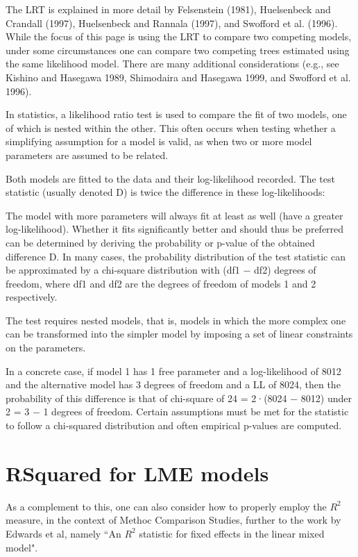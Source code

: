 \documentclass[12pt, a4paper]{report}
\theoremstyle{plain}
\theoremstyle{definition}
\theoremstyle{remark}
\begin{document}
The LRT is explained in more detail by Felsenstein (1981), Huelsenbeck and Crandall (1997), Huelsenbeck and Rannala (1997), and Swofford et al. (1996). While the focus of this page is using the LRT to compare two competing models, under some circumstances one can compare two competing trees estimated using the same likelihood model. There are many additional considerations (e.g., see Kishino and Hasegawa 1989, Shimodaira and Hasegawa 1999, and Swofford et al. 1996).


In statistics, a likelihood ratio test is used to compare the fit of two models, one of which is nested within the other. This often occurs when testing whether a simplifying assumption for a model is valid, as when two or more model parameters are assumed to be related.

Both models are fitted to the data and their log-likelihood recorded. The test statistic (usually denoted D) is twice the difference in these log-likelihoods:

The model with more parameters will always fit at least as well (have a greater log-likelihood). Whether it fits significantly better and should thus be preferred can be determined by deriving the probability or p-value of the obtained difference D. In many cases, the probability distribution of the test statistic can be approximated by a chi-square distribution with (df1 − df2) degrees of freedom, where df1 and df2 are the degrees of freedom of models 1 and 2 respectively.

The test requires nested models, that is, models in which the more complex one can be transformed into the simpler model by imposing a set of linear constraints on the parameters.

In a concrete case, if model 1 has 1 free parameter and a log-likelihood of 8012 and the alternative model has 3 degrees of freedom and a LL of 8024, then the probability of this difference is that of chi-square of 24 = 2·(8024 − 8012) under 2 = 3 − 1 degrees of freedom. Certain assumptions must be met for the statistic to follow a chi-squared distribution and often empirical p-values are computed.
	
	
	\section{RSquared for LME models}
	
	As a complement to this, one can also consider how to properly employ the $R^2$ measure, in the context of Methoc Comparison Studies, further to the work by Edwards et al, namely ``An $R^2$ statistic for fixed effects in the linear mixed model".
	
\end{document}
